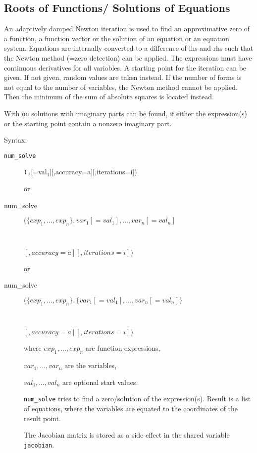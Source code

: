 \subsection{Roots of Functions/ Solutions of Equations}
\hypertarget{operator:NUM_SOLVE}{}

An adaptively damped Newton iteration is used to find
an approximative zero of a function, a function vector or the solution
of an equation or an equation system. Equations are
internally converted to a difference of lhs and rhs such
that the Newton method (=zero detection) can be applied. The expressions
must have continuous derivatives for all variables.
A starting point for the iteration can be given. If not given,
random values are taken instead. If the number of
forms is not equal to the number of variables, the
Newton method cannot be applied. Then the minimum
of the sum of absolute squares is located instead.

With \texttt{on}  solutions with imaginary parts can be
found, if either the expression(s) or the starting point
contain a nonzero imaginary part.

Syntax:

\begin{description}
\item[\texttt{num\_solve}] \texttt{(}\texttt{,}[=val$_1$][,accuracy=a][,iterations=i])

or

\item[num\_solve]  $(\{exp_1,\ldots,exp_n\},
   var_1[=val_1],\ldots,var_n[=val_n]$
\item[\ \ \ \ \ \ \ \ ]$[,accuracy=a][,iterations=i])$

or

\item[num\_solve]  $(\{exp_1,\ldots,exp_n\},
   \{var_1[=val_1],\ldots,var_n[=val_n]\}$
\item[\ \ \ \ \ \ \ \ ]$[,accuracy=a][,iterations=i])$

where $exp_1, \ldots,exp_n$ are function expressions,

      $var_1, \ldots, var_n$ are the variables,

      $val_1, \ldots, val_n$ are optional start values.

\texttt{num\_solve} tries to find a zero/solution of the expression(s).
Result is a list of equations, where the variables are
equated to the coordinates of the result point.

\hypertarget{reserved:JACOBIAN}{}
The Jacobian matrix is stored as a side effect in the shared
variable \texttt{jacobian}.

\end{description}

